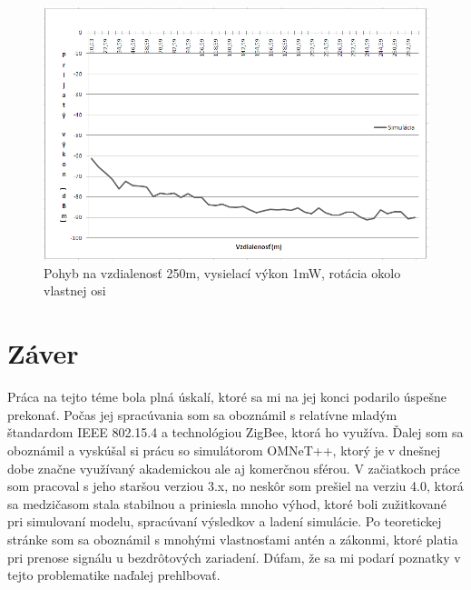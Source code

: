 \documentclass[11pt,twoside,a4paper]{book}
\begin{document}
\begin{figure}[htbp]
 \centering
 \includegraphics[width=13cm]{./figures/results/250-1mw-rotace.png}
 \caption{Pohyb na vzdialenosť 250m, vysielací výkon 1mW, rotácia okolo vlastnej osi}
 \label{fig:250m-1mW-rotace}
\end{figure}


\chapter{Záver}

Práca na tejto téme bola plná úskalí, ktoré sa mi na jej konci podarilo úspešne prekonať. Počas jej spracúvania som sa oboznámil s relatívne mladým štandardom IEEE 802.15.4 a technológiou ZigBee, ktorá ho využíva. Ďalej som sa oboznámil a vyskúšal si prácu so simulátorom OMNeT++, ktorý je v dnešnej dobe značne využívaný akademickou ale aj komerčnou sférou. V začiatkoch práce som pracoval s jeho staršou verziou 3.x, no neskôr som prešiel na verziu 4.0, ktorá sa medzičasom stala stabilnou a priniesla mnoho výhod, ktoré boli zužitkované pri simulovaní modelu, spracúvaní výsledkov a ladení simulácie. Po teoretickej stránke som sa oboznámil s mnohými vlastnosťami antén a zákonmi, ktoré platia pri prenose signálu u bezdrôtových zariadení. Dúfam, že sa mi podarí poznatky v tejto problematike naďalej prehlbovať.
\end{document}
